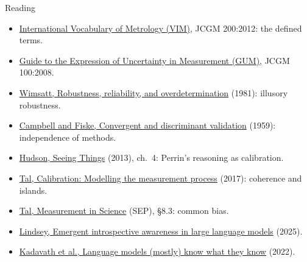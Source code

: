 \documentclass[aspectratio=169,11pt]{beamer}
\begin{document}
\begin{frame}[label=reading]{Reading}
\footnotesize
\begin{itemize}\setlength\itemsep{1pt}
  \item \href{https://www.bipm.org/documents/20126/2071204/JCGM_200_2012.pdf}{International Vocabulary of Metrology (VIM)}, JCGM 200:2012: the defined terms.
  \item \href{https://www.bipm.org/documents/20126/2071204/JCGM_100_2008_E.pdf}{Guide to the Expression of Uncertainty in Measurement (GUM)}, JCGM 100:2008.
  \item \href{https://link.springer.com/chapter/10.1007/978-94-007-2759-5_2}{Wimsatt, Robustness, reliability, and overdetermination} (1981): illusory robustness.
  \item \href{https://www.ovid.com/journals/plbul/fulltext/00006823-195903000-00001~convergent-and-discriminant-validation-by-the}{Campbell and Fiske, Convergent and discriminant validation} (1959): independence of methods.
  \item \href{https://academic.oup.com/book/9863}{Hudson, Seeing Things} (2013), ch.~4: Perrin's reasoning as calibration.
  \item \href{https://philpapers.org/rec/TALCMT}{Tal, Calibration: Modelling the measurement process} (2017): coherence and islands.
  \item \href{https://plato.stanford.edu/entries/measurement-science/}{Tal, Measurement in Science} (SEP), \S8.3: common bias.
  \item \href{https://arxiv.org/abs/2601.01828}{Lindsey, Emergent introspective awareness in large language models} (2025).
  \item \href{https://arxiv.org/abs/2207.05221}{Kadavath et al., Language models (mostly) know what they know} (2022).
\end{itemize}
\end{frame}
\end{document}
